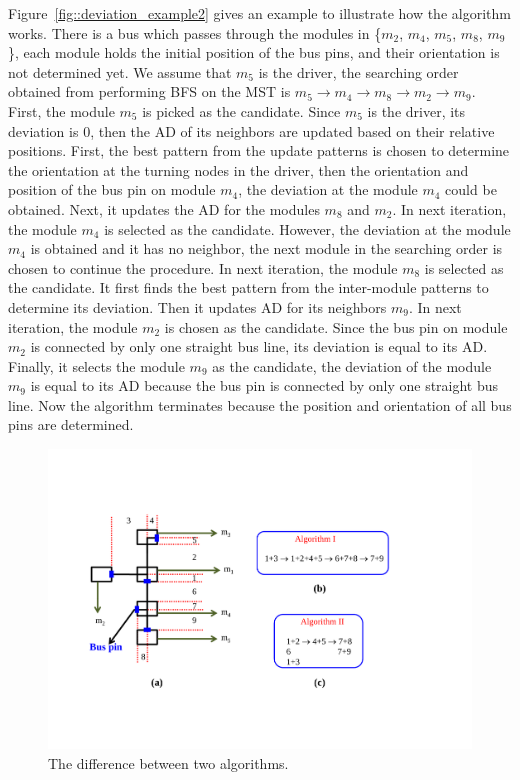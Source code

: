 Figure~\ref{fig::deviation_example2} gives an example to illustrate how the algorithm works.
There is a bus which passes through the modules in
\{$m_2$, $m_4$, $m_5$, $m_8$, $m_9$\}, each module holds the initial
position of the bus pins, and their orientation is not determined yet. We assume that $m_5$ is
the driver, the searching order obtained from performing BFS on the MST is $m_5 \rightarrow m_4
\rightarrow m_8 \rightarrow m_2 \rightarrow m_9$. First, the module $m_5$ is
picked as the candidate. Since $m_5$ is the driver, its deviation is 0, then the AD of its neighbors
are updated based on their relative positions.
First, the best pattern from the update patterns is chosen to determine the orientation at the turning nodes in the driver,
then the orientation and position of the bus pin on module $m_4$, the deviation at the module $m_4$ could be obtained.
Next, it updates the AD for the modules $m_8$ and $m_2$. In next iteration, the module $m_4$ is selected as the candidate.
However, the deviation at the module $m_4$ is obtained and it has no neighbor,
the next module in the searching order is chosen to continue the procedure.
In next iteration, the module $m_8$ is selected as the candidate.
It first finds the best pattern from the inter-module patterns to determine its deviation.
Then it updates AD for its neighbors $m_9$. In next iteration, the module $m_2$ is chosen as the candidate.
Since the bus pin on module $m_2$ is connected by only one straight bus line, its deviation is equal to
its AD. Finally, it selects the module $m_9$ as the candidate, the deviation of the module $m_9$ is equal to
its AD because the bus pin is connected by only one straight bus line.
Now the algorithm terminates because the position and orientation of all bus pins are determined.

\begin{figure}[htb]
  \centering
    \includegraphics[width=13cm]{Fig/algorithm_comparison.pdf}
     \caption{
      The difference between two algorithms.
   }
  \label{fig::algorithm_comparison}
\end{figure}

